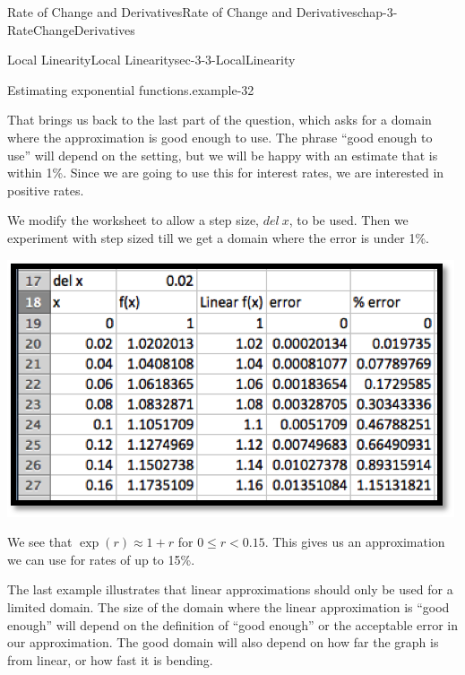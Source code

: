 \documentclass[oneside,10pt,]{book}
\numberwithin{equation}{section}
\newcommand{\lt}{<}
\begin{document}
\begin{chapterptx}{Rate of Change and Derivatives}{}{Rate of Change and Derivatives}{}{}{chap-3-RateChangeDerivatives}
\begin{sectionptx}{Local Linearity}{}{Local Linearity}{}{}{sec-3-3-LocalLinearity}
\begin{example}{Estimating exponential functions.}{example-32}
\begin{sidebyside}{1}{0.2}{0.2}{0}
\begin{sbspanel}{0.6}
\end{sbspanel}%
\end{sidebyside}%
\par
\hypertarget{p-1159}{}%
That brings us back to the last part of the question, which asks for a domain where the approximation is good enough to use.  The phrase ``good enough to use'' will depend on the setting, but we will be happy with an estimate that is within 1\%.  Since we are going to use this for interest rates, we are interested in positive rates.%
\par
\hypertarget{p-1160}{}%
We modify the worksheet to allow a step size, \(del\ x\), to be used.  Then we experiment with step sized till we get a domain where the error is under 1\%.%
\begin{sidebyside}{1}{0.2}{0.2}{0}%
\begin{sbspanel}{0.6}%
\includegraphics[width=1\linewidth]{images/sec3-3-11.png}
\end{sbspanel}%
\end{sidebyside}%
\par
\hypertarget{p-1161}{}%
We see that \(\exp(r)\approx 1+r\) for \(0\le r\lt 0.15\). This gives us an approximation we can use for rates of up to 15\%.%
\end{example}
\hypertarget{p-1162}{}%
The last example illustrates that linear approximations should only be used for a limited domain.  The size of the domain where the linear approximation is ``good enough'' will depend on the definition of ``good enough'' or the acceptable error in our approximation.  The good domain will also depend on how far the graph is from linear, or how fast it is bending.%
%
%
\typeout{************************************************}
\typeout{************************************************}

\end{sectionptx}
\end{chapterptx}
\end{document}
